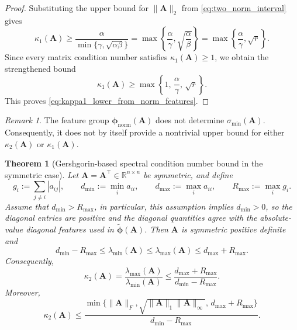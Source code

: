 \documentclass[11pt,a4paper]{article}
\theoremstyle{plain}
\newtheorem{theorem}{Theorem}[section]
\theoremstyle{definition}
\theoremstyle{remark}
\newtheorem{remark}{Remark}
\begin{document}
\begin{proof}
Substituting the upper bound for $\|\mathbf{A}\|_2$ from \eqref{eq:two_norm_interval} gives
\begin{equation*}
\kappa_1(\mathbf{A})
\ge
\frac{\alpha}{\min\{\gamma,\sqrt{\alpha\beta}\}}
=
\max\!\left\{\frac{\alpha}{\gamma},\sqrt{\frac{\alpha}{\beta}}\right\}
=
\max\!\left\{\frac{\alpha}{\gamma},\sqrt{r}\right\}.
\end{equation*}
Since every matrix condition number satisfies $\kappa_1(\mathbf A)\ge 1$, we obtain the strengthened bound
\begin{equation*}
\kappa_1(\mathbf A)
\ge
\max\!\left\{
1,\,
\frac{\alpha}{\gamma},\,
\sqrt r
\right\}.
\end{equation*}
This proves \eqref{eq:kappa1_lower_from_norm_features}.
\end{proof}

\begin{remark}
\label{rem:no_kappa2_upper_from_norm_only}
The feature group $\bm{\phi}_{\mathrm{norm}}(\mathbf{A})$ does not determine $\sigma_{\min}(\mathbf{A})$. Consequently, it does not by itself provide a nontrivial upper bound for either $\kappa_2(\mathbf{A})$ or $\kappa_1(\mathbf{A})$.
\end{remark}


\begin{theorem}[Gershgorin-based spectral condition number bound in the symmetric case]
\label{thm:gers_bounds_correct}
Let $\mathbf{A}=\mathbf{A}^\top\in\mathbb{R}^{n\times n}$ be symmetric, and define
\begin{equation*}
g_i:=\sum_{j\neq i}|a_{ij}|,\qquad
d_{\min}:=\min_i a_{ii},\qquad
d_{\max}:=\max_i a_{ii},\qquad
R_{\max}:=\max_i g_i.
\end{equation*}
Assume that $d_{\min}>R_{\max}$, in particular, this assumption implies $d_{\min}>0$, so the diagonal entries are positive and the diagonal quantities agree with the absolute-value diagonal features used in $\widetilde{\bm{\phi}}(\mathbf A)$.
Then $\mathbf{A}$ is symmetric positive definite and
\begin{equation}
\label{eq:eig_interval_gers}
d_{\min}-R_{\max}
\le
\lambda_{\min}(\mathbf{A})
\le
\lambda_{\max}(\mathbf{A})
\le
d_{\max}+R_{\max}.
\end{equation}
Consequently,
\begin{equation}
\label{eq:kappa2_gers_exact}
\kappa_2(\mathbf{A})
=
\frac{\lambda_{\max}(\mathbf{A})}{\lambda_{\min}(\mathbf{A})}
\le
\frac{d_{\max}+R_{\max}}{d_{\min}-R_{\max}}.
\end{equation}
Moreover,
\begin{equation}
\label{eq:kappa2_gers_with_norms}
\kappa_2(\mathbf{A})
\le
\frac{\min\{\|\mathbf{A}\|_F,\sqrt{\|\mathbf{A}\|_1\|\mathbf{A}\|_\infty},\,d_{\max}+R_{\max}\}}
{d_{\min}-R_{\max}}.
\end{equation}
\end{theorem}
\end{document}
